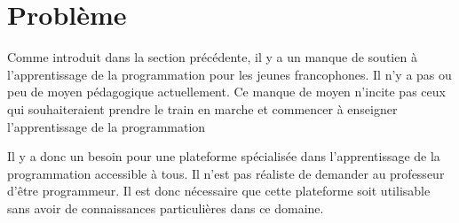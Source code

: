 \section{Problème}
\label{into-problem}
Comme introduit dans la section précédente, il y a un manque de soutien à l'apprentissage de la programmation pour les jeunes francophones. Il n'y a pas ou peu de moyen pédagogique actuellement. Ce manque de moyen n'incite pas ceux qui souhaiteraient prendre le train en marche et commencer à enseigner l'apprentissage de la programmation

Il y a donc un besoin pour une plateforme spécialisée dans l'apprentissage de la programmation accessible à tous. Il n'est pas réaliste de demander au professeur d'être programmeur. Il est donc nécessaire que cette plateforme soit utilisable sans avoir de connaissances particulières dans ce domaine.
